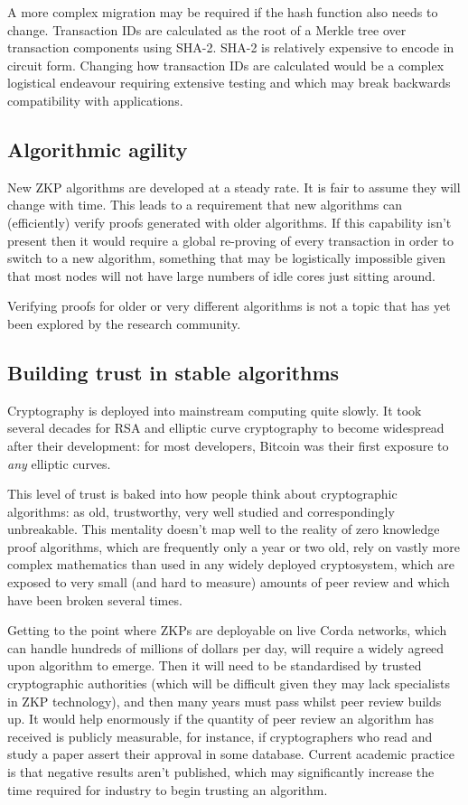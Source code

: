 \documentclass{article}
\begin{document}
A more complex migration may be required if the hash function also needs to change. Transaction IDs are calculated
as the root of a Merkle tree over transaction components using SHA-2. SHA-2 is relatively expensive to encode in
circuit form. Changing how transaction IDs are calculated would be a complex logistical endeavour requiring
extensive testing and which may break backwards compatibility with applications.

\subsection{Algorithmic agility}

New ZKP algorithms are developed at a steady rate. It is fair to assume they will change with time. This leads
to a requirement that new algorithms can (efficiently) verify proofs generated with older algorithms. If this
capability isn't present then it would require a global re-proving of every transaction in order to switch to
a new algorithm, something that may be logistically impossible given that most nodes will not have large numbers
of idle cores just sitting around.

Verifying proofs for older or very different algorithms is not a topic that has yet been explored by the research
community.

\subsection{Building trust in stable algorithms}

Cryptography is deployed into mainstream computing quite slowly. It took several decades for RSA and elliptic curve
cryptography to become widespread after their development: for most developers, Bitcoin was their first exposure to
\emph{any} elliptic curves.

This level of trust is baked into how people think about cryptographic algorithms: as old, trustworthy, very well
studied and correspondingly unbreakable. This mentality doesn't map well to the reality of zero knowledge proof
algorithms, which are frequently only a year or two old, rely on vastly more complex mathematics than used in any
widely deployed cryptosystem, which are exposed to very small (and hard to measure) amounts of peer review and
which have been broken several times.

Getting to the point where ZKPs are deployable on live Corda networks, which can handle hundreds of millions of
dollars per day, will require a widely agreed upon algorithm to emerge. Then it will need to be standardised by
trusted cryptographic authorities (which will be difficult given they may lack specialists in ZKP technology), and
then many years must pass whilst peer review builds up. It would help enormously if the quantity of peer review an
algorithm has received is publicly measurable, for instance, if cryptographers who read and study a paper assert
their approval in some database. Current academic practice is that negative results aren't published, which may
significantly increase the time required for industry to begin trusting an algorithm.
\end{document}
